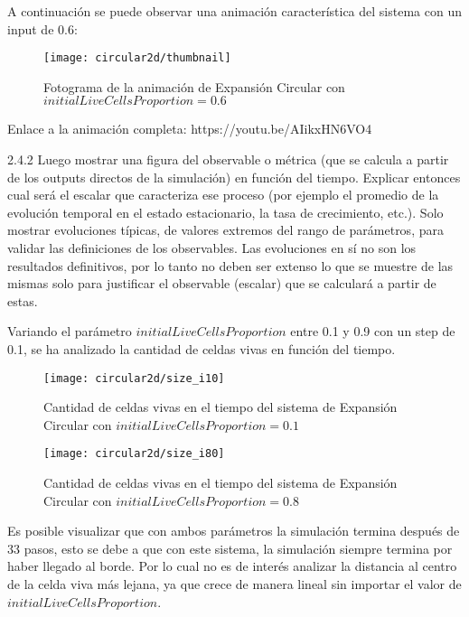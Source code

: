A continuación se puede observar una animación característica del sistema con un input de 0.6:

\begin{figure}[H]
    \centering
    \texttt{[image: circular2d/thumbnail]}
    \caption{Fotograma de la animación de Expansión Circular con $initialLiveCellsProportion = 0.6$}
    \label{fig:thumbnailcircular2d_i60}
\end{figure}

Enlace a la animación completa: https://youtu.be/AIikxHN6VO4

2.4.2 Luego mostrar una figura del observable o métrica (que se calcula a partir de los outputs 
directos de la simulación) en función del tiempo. Explicar entonces cual será el escalar que 
caracteriza ese proceso (por ejemplo el promedio de la evolución temporal en el estado 
estacionario, la tasa de crecimiento, etc.). Solo mostrar evoluciones típicas, de valores extremos 
del rango de parámetros, para validar las definiciones de los observables. Las evoluciones en sí 
no son los resultados definitivos, por lo tanto no deben ser extenso lo que se muestre de las 
mismas solo para justificar el observable (escalar) que se calculará a partir de estas.


Variando el parámetro $initialLiveCellsProportion$ entre 0.1 y 0.9 con un step de 0.1, se ha analizado la cantidad de celdas vivas en función
del tiempo.

\begin{figure}[H]
    \centering
    \texttt{[image: circular2d/size\_i10]}
    \caption{Cantidad de celdas vivas en el tiempo del sistema de Expansión Circular con $initialLiveCellsProportion = 0.1$}
    \label{fig:circular2d_i10}
\end{figure}
\begin{figure}[H]
    \centering
    \texttt{[image: circular2d/size\_i80]}
    \caption{Cantidad de celdas vivas en el tiempo del sistema de Expansión Circular con $initialLiveCellsProportion = 0.8$}
    \label{fig:circular2d_i80}
\end{figure}


Es posible visualizar que con ambos parámetros la simulación termina después de 33 pasos, esto se debe a que con este sistema, la simulación
siempre termina por haber llegado al borde. Por lo cual no es de interés analizar la distancia al centro de la celda viva más lejana, ya que
crece de manera lineal sin importar el valor de $initialLiveCellsProportion$.

